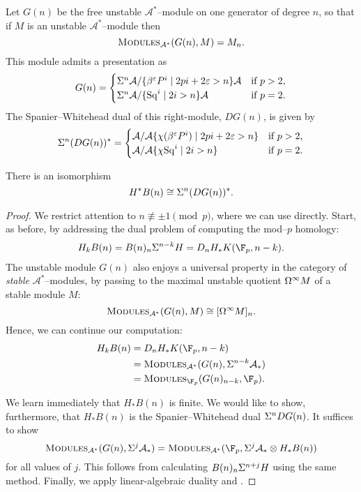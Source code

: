 \begin{definition}\label{SpanierWhiteheadDualOfGeneratingModule}
Let \(G(n)\) be the free unstable \(\mathcal A^*\)--module on one generator of degree \(n\), so that if \(M\) is an unstable \(\mathcal A^*\)--module then \[\normalfont\textsc{Modules}_{\mathcal A^*}(G(n), M) = M_n.\]  This module admits a presentation as \[G(n) = \begin{cases} \Sigma^n \mathcal A / \{\beta^\varepsilon P^i \mid 2pi + 2\varepsilon > n\}\mathcal A & \text{if \(p > 2\)}, \\ \Sigma^n \mathcal A / \{\operatorname{Sq}^i \mid 2i > n\}\mathcal A & \text{if \(p = 2\)}. \end{cases}\]  The Spanier--Whitehead dual of this right-module, \(DG(n)\), is given by \[\Sigma^n (D G(n))^* = \begin{cases}\mathcal A / \mathcal A \{\chi(\beta^\varepsilon P^i) \mid 2pi + 2\varepsilon > n\} & \text{if \(p > 2\)}, \\ \mathcal A / \mathcal A \{\chi{\operatorname{Sq}^i} \mid 2i > n\} & \text{if \(p = 2\)}. \end{cases}\]
\end{definition}

\begin{theorem}
There is an isomorphism \[H^* B(n) \cong \Sigma^n(DG(n))^*.\]
\end{theorem}
\begin{proof}
We restrict attention to \(n \not\equiv \pm 1 \pmod p\), where we can use  directly.  Start, as before, by addressing the dual problem of computing the mod--\(p\) homology:
\begin{align*}
H_k B(n) = B(n)_n \Susp^{n-k} H = D_n H_* K(\F_p, n-k).
\end{align*}
The unstable module \(G(n)\) also enjoys a universal property in the category of \emph{stable} \(\mathcal A^*\)--modules, by passing to the maximal unstable quotient \(\Omega^\infty M\) of a stable module \(M\): \[\normalfont\textsc{Modules}_{\mathcal A^*}(G(n), M) \cong [\Omega^\infty M]_n.\]  Hence, we can continue our computation:
\begin{align*}
H_k B(n) & = D_n H_* K(\F_p, n-k) \\
& = \CatOf{Modules}_{\mathcal A^*}(G(n), \Susp^{n-k} \mathcal A_*) \\
& = \CatOf{Modules}_{\F_p}(G(n)_{n-k}, \F_p).
\end{align*}

We learn immediately that \(H_* B(n)\) is finite.  We would like to show, furthermore, that \(H_* B(n)\) is the Spanier--Whitehead dual \(\Sigma^n DG(n)\).  It suffices to show \[\CatOf{Modules}_{\mathcal A^*}(G(n), \Susp^j \mathcal A_*) = \CatOf{Modules}_{\mathcal A^*}(\F_p, \Susp^j \mathcal A_* \otimes H_* B(n))\] for all values of \(j\).  This follows from calculating \(B(n)_n \Sigma^{n+j} H\) using the same method.  Finally, we apply linear-algebraic duality and .
\end{proof}

